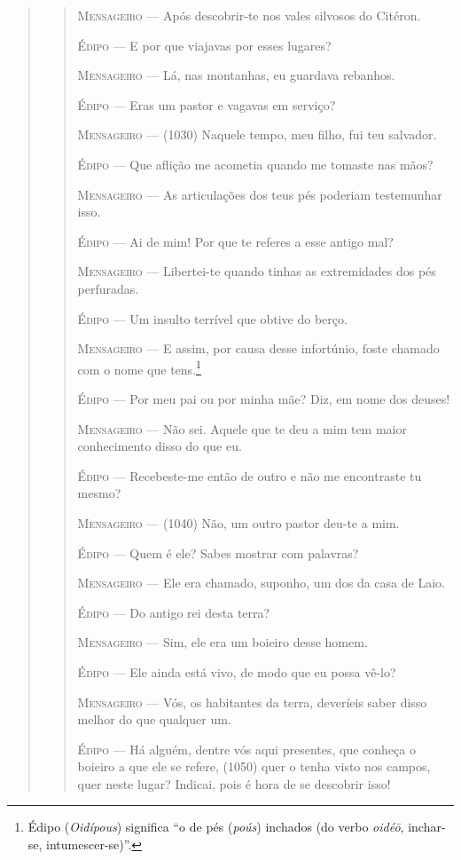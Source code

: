 \begin{verse}
\begin{verse}
\textsc{Mensageiro} --- Após descobrir-te nos vales silvosos do Citéron.

\textsc{Édipo} --- E por que viajavas por esses lugares?

\textsc{Mensageiro} --- Lá, nas montanhas, eu guardava rebanhos.

\textsc{Édipo} --- Eras um pastor e vagavas em serviço?

\textsc{Mensageiro} --- (1030) Naquele tempo, meu filho, fui teu salvador.

\textsc{Édipo} --- Que aflição me acometia quando me tomaste nas mãos?

\textsc{Mensageiro} --- As articulações dos teus pés poderiam testemunhar isso.

\textsc{Édipo} --- Ai de mim! Por que te referes a esse antigo mal?

\textsc{Mensageiro} --- Libertei-te quando tinhas as extremidades dos pés perfuradas.

\textsc{Édipo} --- Um insulto terrível que obtive do berço.

\textsc{Mensageiro} --- E assim, por causa desse infortúnio, foste chamado com o nome que
tens.\footnote{Édipo (\emph{Oidípous}) significa ``o de pés (\emph{poús})
  inchados (do verbo \emph{oidéō}, inchar-se, intumescer-se)''.}

\textsc{Édipo} --- Por meu pai ou por minha mãe? Diz, em nome dos deuses!

\textsc{Mensageiro} --- Não sei. Aquele que te deu a mim tem maior conhecimento disso do que eu.

\textsc{Édipo} --- Recebeste-me então de outro e não me encontraste tu mesmo?

\textsc{Mensageiro} --- (1040) Não, um outro pastor deu-te a mim.

\textsc{Édipo} --- Quem é ele? Sabes mostrar com palavras?

\textsc{Mensageiro} --- Ele era chamado, suponho, um dos da casa de Laio.

\textsc{Édipo} --- Do antigo rei desta terra?

\textsc{Mensageiro} --- Sim, ele era um boieiro desse homem.

\textsc{Édipo} --- Ele ainda está vivo, de modo que eu possa vê-lo?

\textsc{Mensageiro} --- Vós, os habitantes da terra, deveríeis saber disso melhor do que
qualquer um.

\textsc{Édipo} --- Há alguém, dentre vós aqui presentes, que conheça o boieiro a que ele se
refere, (1050) quer o tenha visto nos campos, quer neste lugar? Indicai,
pois é hora de se descobrir isso!


\end{verse}
\end{verse}
